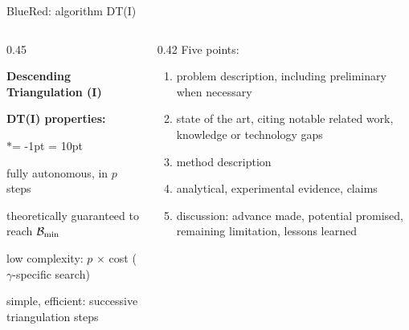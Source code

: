 

\begin{frame}{BlueRed: algorithm DT(I)}

\begin{columns}
\begin{column}{0.45\textwidth}                 %

{\small \bf Descending Triangulation (I)}
% 
\begin{overprint}
\end{overprint}

\vspace*{0.5em}

{\small \bf DT(I) properties:}
  \begin{list}{$\ast$}{\itemsep = -1pt \leftmargin = 10pt}
    \footnotesize 
	\item fully autonomous, in $p$ steps
	\item theoretically guaranteed to reach ${\cal B}_{\min}$
	\item low complexity: $p\!$ $\times\!$ cost ($\gamma$-specific search)
	\item simple, efficient: successive triangulation steps
\end{list}
% 
\end{column}

\hspace*{4em}                                                          %

\begin{column}{0.42\textwidth}                                %
  Five points: 
  \begin{enumerate}
  \item problem description, including preliminary when necessary 
  \item state of the art, citing notable  related work,
     knowledge or technology gaps 
  \item method description 
  \item analytical, experimental evidence, claims 
  \item discussion: advance made, potential promised, remaining limitation, lessons learned 
  \end{enumerate}
\end{column}
%
\end{columns}   %
% 
\end{frame}

